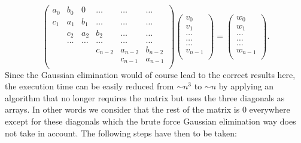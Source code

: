 \documentclass[11pt,a4wide]{article}
\begin{document}
\begin{equation}
    \left(\begin{array}{cccccc}
                           a_0& b_0 & 0 &\dots   & \dots &\dots \\
                           c_1 & a_1 & b_1 &\dots &\dots &\dots \\
                           & c_2 & a_2 & b_2 & \dots & \dots \\
                           & \dots   & \dots &\dots   &\dots & \dots \\
                           &   &  &c_{n-2}  &a_{n-2}& b_{n-2} \\
                           &    &  &   &c_{n-1} & a_ {n-1}\\
                      \end{array} \right)\left(\begin{array}{c}
                           v_0\\
                           v_1\\
                           \dots \\
                          \dots  \\
                          \dots \\
                           v_{n-1}\\
                      \end{array} \right)
  =\left(\begin{array}{c}
                           w_0\\
                           w_1\\
                           \dots \\
                           \dots \\
                          \dots \\
                           w_{n-1}\\
                      \end{array} \right).
											\label{M}
\end{equation}
Since the Gaussian elimination would of course lead to the correct results here, the execution time can be easily reduced from $\sim n^3$ to $\sim n$ by applying an algorithm that no longer requires the matrix but uses the three diagonals as arrays. In other words we consider that the rest of the matrix is 0 everywhere except for these diagonals which the brute force Gaussian elimination way does not take in account. The following steps have then to be taken:
\end{document}
